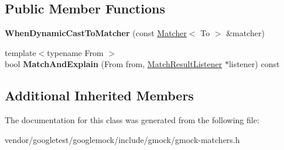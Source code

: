 \subsection*{Public Member Functions}
\begin{DoxyCompactItemize}
\item 
{\bfseries When\+Dynamic\+Cast\+To\+Matcher} (const \hyperlink{classtesting_1_1Matcher}{Matcher}$<$ To $>$ \&matcher)\hypertarget{classtesting_1_1internal_1_1WhenDynamicCastToMatcher_a44e444d218197f8180c5ac7fca135f9a}{}\label{classtesting_1_1internal_1_1WhenDynamicCastToMatcher_a44e444d218197f8180c5ac7fca135f9a}

\item 
{\footnotesize template$<$typename From $>$ }\\bool {\bfseries Match\+And\+Explain} (From from, \hyperlink{classtesting_1_1MatchResultListener}{Match\+Result\+Listener} $\ast$listener) const \hypertarget{classtesting_1_1internal_1_1WhenDynamicCastToMatcher_afea5e5230fa9955bfdf9902587c44676}{}\label{classtesting_1_1internal_1_1WhenDynamicCastToMatcher_afea5e5230fa9955bfdf9902587c44676}

\end{DoxyCompactItemize}
\subsection*{Additional Inherited Members}


The documentation for this class was generated from the following file\+:\begin{DoxyCompactItemize}
\item 
vendor/googletest/googlemock/include/gmock/gmock-\/matchers.\+h\end{DoxyCompactItemize}
